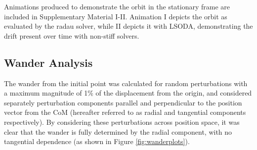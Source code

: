 \documentclass[11pt, a4paper,twocolumn]{article} %
\begin{document}
Animations produced to demonstrate the orbit in the stationary frame are included in Supplementary Material I-II. Animation I depicts the orbit as evaluated by the radau solver, while II depicts it with LSODA, demonstrating the drift present over time with non-stiff solvers.

\subsection{Wander Analysis}
The wander from the initial point was calculated for random perturbations with a maximum magnitude of 1\% of the displacement from the origin, and considered  separately perturbation components parallel and perpendicular to the position vector from the CoM (hereafter referred to as radial and tangential components respectively). By considering these perturbations across position space, it was clear that the wander is fully determined by the radial component, with no tangential dependence (as shown in Figure \ref{fig:wanderplots}).
\end{document}
